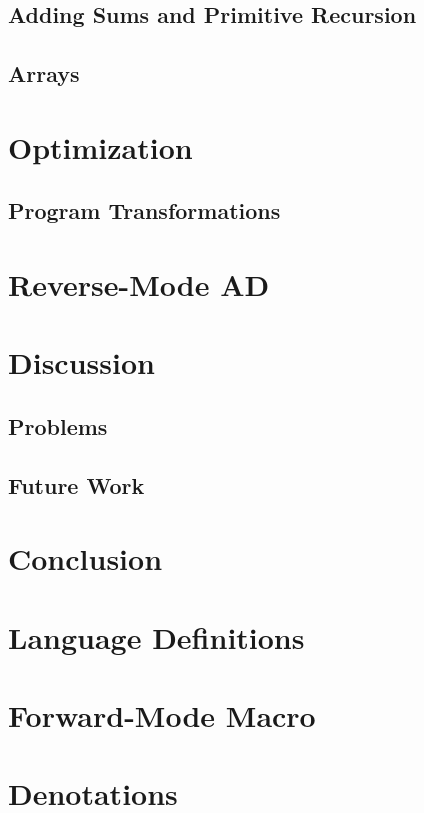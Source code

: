 \documentclass[11pt, final]{article}
\begin{document}
  \subsection{Adding Sums and Primitive Recursion}
  \subsection{Arrays}
\section{Optimization}
  \subsection{Program Transformations}
\section{Reverse-Mode AD}
\section{Discussion}
  \subsection{Problems}
  \subsection{Future Work}
\section{Conclusion}

\appendix
\section{Language Definitions}
\section{Forward-Mode Macro}
\section{Denotations}
\printbibliography
\makeatother
\end{document}

